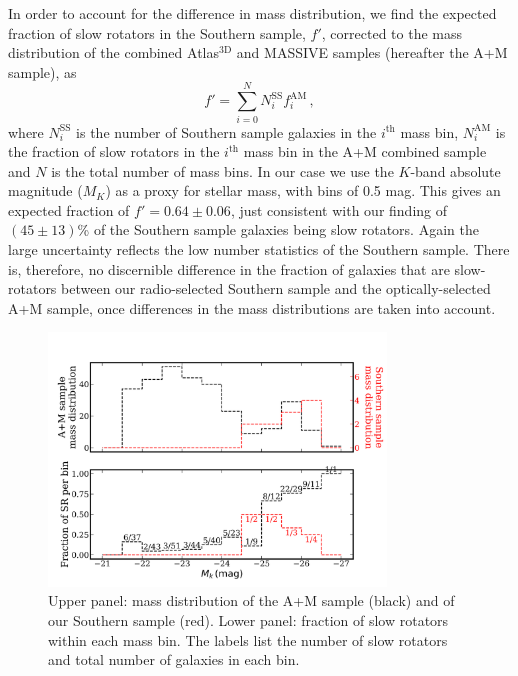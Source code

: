 			In order to account for the difference in mass distribution, we find the expected fraction of slow rotators in the Southern sample, $f'$, corrected to the mass distribution of the combined Atlas$^\text{3D}$ and MASSIVE samples (hereafter the A+M sample), as
			\begin{equation}
				f' = \sum_{i=0}^N N^\mathrm{SS}_i f^\mathrm{AM}_i \, , 
			\end{equation}
			where $N^\mathrm{SS}_i$ is the number of Southern sample galaxies in the $i^\mathrm{th}$ mass bin, $N^\mathrm{AM}_i$ is the fraction of slow rotators in the $i^\mathrm{th}$ mass bin in the A+M combined sample and $N$ is the total number of mass bins. In our case we use the $K$-band absolute magnitude ($M_K$) as a proxy for stellar mass, with bins of 0.5 mag. This gives an expected fraction of $f' = 0.64 \pm 0.06$, just consistent with our finding of $(45\pm13)$\% of the Southern sample galaxies being slow rotators. Again the large uncertainty reflects the low number statistics of the Southern sample. There is, therefore, no discernible difference in the fraction of galaxies that are slow-rotators between our radio-selected Southern sample and the optically-selected A+M sample, once differences in the mass distributions are taken into account. 

			\begin{figure}
				\centering
				\includegraphics[width=0.8\textwidth]{chapter4/M_k_binned.png}
				\caption[Mass matching global kinematics]{Upper panel: mass distribution of the A+M sample (black) and of our Southern sample (red). Lower panel: fraction of slow rotators within each mass bin. The labels list the number of slow rotators and total number of galaxies in each bin.}
				\label{fig:SRmassFraction}
			\end{figure}

